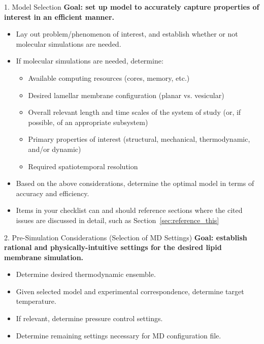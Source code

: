 \documentclass[9pt,bestpractices]{livecoms}
\begin{document}
\begin{Checklists*}[p!]

\begin{checklist}{1. Model Selection}
\textbf{Goal: set up model to accurately capture properties of interest in an efficient manner.}
\begin{itemize}
\item Lay out problem/phenomenon of interest, and establish whether or not molecular simulations are needed.
\item If molecular simulations are needed, determine:
	\begin{itemize}
	\item Available computing resources (cores, memory, etc.)
	\item Desired lamellar membrane configuration (planar vs. vesicular)
	\item Overall relevant length and time scales of the system of study (or, if possible, of an appropriate subsystem)
	\item Primary properties of interest (structural, mechanical, thermodynamic, and/or dynamic)
	\item Required spatiotemporal resolution
	\end{itemize}
\item Based on the above considerations, determine the optimal model in terms of accuracy and efficiency.
\item Items in your checklist can and should reference sections where the cited issues are discussed in detail, such as Section~\ref{sec:reference_this}
\end{itemize}
\end{checklist}

\begin{checklist}{2. Pre-Simulation Considerations (Selection of MD Settings)}
\textbf{Goal: establish rational and physically-intuitive settings for the desired lipid membrane simulation.}
\begin{itemize}
\item Determine desired thermodynamic ensemble.
\item Given selected model and experimental correspondence, determine target temperature.
\item If relevant, determine pressure control settings.
\item Determine remaining settings necessary for MD configuration file.
\end{itemize}
\end{checklist}


\end{Checklists*}
\end{document}
